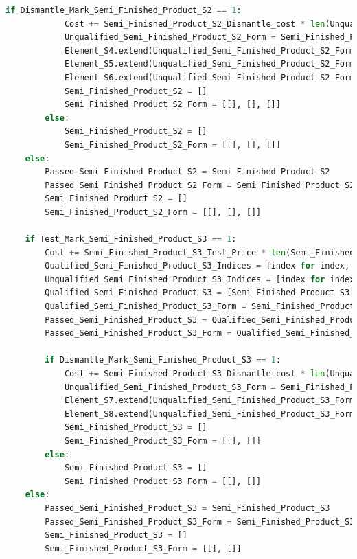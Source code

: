 \documentclass[withoutpreface,bwprint]{cumcmthesis} %
\begin{document}
\begin{appendices}
\begin{lstlisting}[language=python]
        if Dismantle_Mark_Semi_Finished_Product_S2 == 1:
            Cost += Semi_Finished_Product_S2_Dismantle_cost * len(Unqualified_Semi_Finished_Product_S2_Indices)
            Unqualified_Semi_Finished_Product_S2_Form = Semi_Finished_Product_S2_Form[:, Unqualified_Semi_Finished_Product_S2_Indices]
            Element_S4.extend(Unqualified_Semi_Finished_Product_S2_Form[0])
            Element_S5.extend(Unqualified_Semi_Finished_Product_S2_Form[1])
            Element_S6.extend(Unqualified_Semi_Finished_Product_S2_Form[2])
            Semi_Finished_Product_S2 = []
            Semi_Finished_Product_S2_Form = [[], [], []]
        else:
            Semi_Finished_Product_S2 = []
            Semi_Finished_Product_S2_Form = [[], [], []]
    else:
        Passed_Semi_Finished_Product_S2 = Semi_Finished_Product_S2
        Passed_Semi_Finished_Product_S2_Form = Semi_Finished_Product_S2_Form
        Semi_Finished_Product_S2 = []
        Semi_Finished_Product_S2_Form = [[], [], []]

    if Test_Mark_Semi_Finished_Product_S3 == 1:
        Cost += Semi_Finished_Product_S3_Test_Price * len(Semi_Finished_Product_S3)
        Qualified_Semi_Finished_Product_S3_Indices = [index for index, value in enumerate(Semi_Finished_Product_S3) if value == 1]
        Unqualified_Semi_Finished_Product_S3_Indices = [index for index, value in enumerate(Semi_Finished_Product_S3) if value == 0]
        Qualified_Semi_Finished_Product_S3 = [Semi_Finished_Product_S3[i] for i in range(len(Semi_Finished_Product_S3)) if i in Qualified_Semi_Finished_Product_S3_Indices]
        Qualified_Semi_Finished_Product_S3_Form = Semi_Finished_Product_S3_Form[:, Qualified_Semi_Finished_Product_S3_Indices]
        Passed_Semi_Finished_Product_S3 = Qualified_Semi_Finished_Product_S3
        Passed_Semi_Finished_Product_S3_Form = Qualified_Semi_Finished_Product_S3_Form

        if Dismantle_Mark_Semi_Finished_Product_S3 == 1:
            Cost += Semi_Finished_Product_S3_Dismantle_cost * len(Unqualified_Semi_Finished_Product_S3_Indices)
            Unqualified_Semi_Finished_Product_S3_Form = Semi_Finished_Product_S3_Form[:, Unqualified_Semi_Finished_Product_S3_Indices]
            Element_S7.extend(Unqualified_Semi_Finished_Product_S3_Form[0])
            Element_S8.extend(Unqualified_Semi_Finished_Product_S3_Form[1])
            Semi_Finished_Product_S3 = []
            Semi_Finished_Product_S3_Form = [[], []]
        else:
            Semi_Finished_Product_S3 = []
            Semi_Finished_Product_S3_Form = [[], []]
    else:
        Passed_Semi_Finished_Product_S3 = Semi_Finished_Product_S3
        Passed_Semi_Finished_Product_S3_Form = Semi_Finished_Product_S3_Form
        Semi_Finished_Product_S3 = []
        Semi_Finished_Product_S3_Form = [[], []]


\end{lstlisting}
\end{appendices}
\end{document}
